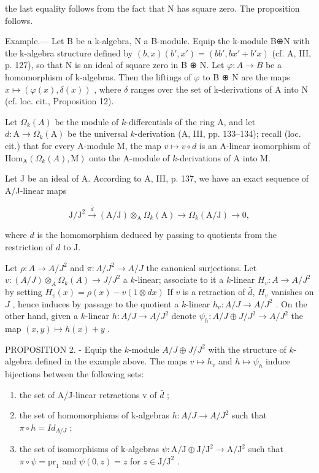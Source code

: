 the last equality follows from the fact that N has square zero. The proposition follows.

Example.--- Let B be a k-algebra, N a B-module. Equip the k-module B⊕N with the k-algebra structure defined by \((b,x)(b',x') = (bb',bx' + b'x)\) (cf. A, III, p. 127), so that N is an ideal of square zero in B ⊕ N. Let \(\varphi : A \to B\) be a homomorphism of k-algebras. Then the liftings of \(\varphi\) to B ⊕ N are the maps \(x \mapsto (\varphi(x), \delta(x))\) , where \(\delta\) ranges over the set of k-derivations of A into N (cf. loc. cit., Proposition 12).

Let \(\Omega_{k}(A)\) be the module of \(k\)-differentials of the ring A, and let \(d: \mathrm{A} \longrightarrow \Omega_{k}(\mathrm{A})\) be the universal \(k\)-derivation (A, III, pp. 133–134); recall (loc. cit.) that for every A-module M, the map \(v \mapsto v \circ d\) is an A-linear isomorphism of \(\mathrm{Hom}_{\mathrm{A}}(\Omega_{k}(A), \mathrm{M})\) onto the A-module of \(k\)-derivations of A into M.

Let J be an ideal of A. According to A, III, p. 137, we have an exact sequence of A/J-linear maps

\[
\mathrm{J} / \mathrm{J} ^ {2} \stackrel {\bar {d}} {\longrightarrow} (\mathrm{A} / \mathrm{J}) \otimes_ {\mathrm{A}} \Omega_ {k} (\mathrm{A}) \longrightarrow \Omega_ {k} (\mathrm{A} / \mathrm{J}) \rightarrow 0,
\]

where \(\bar{d}\) is the homomorphism deduced by passing to quotients from the restriction of \(d\) to J.

Let \(\rho : A \to A/J^{2}\) and \(\pi : A/J^{2} \to A/J\) the canonical surjections. Let \(v : (A/J) \otimes_{A} \Omega_{k}(A) \longrightarrow J/J^{2}\) a \(k\)-linear; associate to it a \(k\)-linear \(H_{v} : A \to A/J^{2}\) by setting \(H_{v}(x) = \rho(x) - v(1 \otimes dx)\) If \(v\) is a retraction of \(\bar{d}\), \(H_{v}\) vanishes on \(J\) , hence induces by passage to the quotient a \(k\)-linear \(h_{v} : A/J \to A/J^{2}\) . On the other hand, given a \(k\)-linear \(h : A/J \to A/J^{2}\) denote \(\psi_{h} : A/J \oplus J/J^{2} \longrightarrow A/J^{2}\) the map \((x,y) \mapsto h(x)+y\) .

PROPOSITION 2. - Equip the \(k\)-module \(A / J \oplus J / J^2\) with the structure of \(k\)-algebra defined in the example above. The maps \(v \mapsto h_v\) and \(h \mapsto \psi_h\) induce bijections between the following sets:

\begin{enumerate}
\def\labelenumi{(\roman{enumi})}
\item
  the set of A/J-linear retractions v of \(\bar{d}\) ;
\item
  the set of homomorphisms of k-algebras \(h: A/J \to A/J^{2}\) such that \(\pi \circ h = Id_{A/J}\) ;
\item
  the set of isomorphisms of k-algebras \(\psi : \mathrm{A} / \mathrm{J} \oplus \mathrm{J} / \mathrm{J}^2 \longrightarrow \mathrm{A} / \mathrm{J}^2\) such that \(\pi \circ \psi = \mathrm{pr}_1\) and \(\psi(0, z) = z\) for \(z \in \mathrm{J} / \mathrm{J}^2\) .
\end{enumerate}

